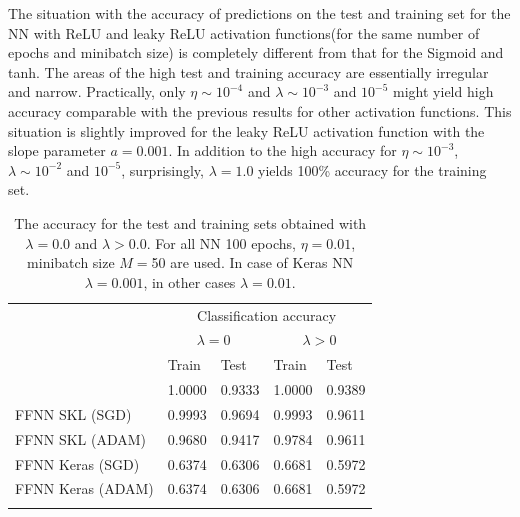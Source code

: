 \documentclass{emulateapj}
\begin{document}
The situation with the accuracy of predictions on the test and training set for the NN with ReLU and leaky ReLU activation functions(for the same number of epochs and minibatch size) is completely different from that for the Sigmoid and tanh. The areas of the high test and training accuracy are essentially irregular and narrow. Practically, only $\eta\sim10^{-4}$ and $\lambda\sim10^{-3}$ and $10^{-5}$ might yield high accuracy comparable with the previous results for other activation functions. This situation is slightly improved for the leaky ReLU activation function with the slope parameter $a=0.001$. In addition to the high accuracy for $\eta\sim10^{-3}$, $\lambda\sim10^{-2}$ and $10^{-5}$, surprisingly, $\lambda=1.0$ yields 100\% accuracy for the training set.


\begin{table}[!htb]
\begin{center}
\caption{\scriptsize The accuracy for the test and training sets obtained with $\lambda=0.0$ and $\lambda>0.0$. For all NN 100 epochs, $\eta=0.01$, minibatch size $M=$50 are used. In case of Keras NN $\lambda=0.001$, in other cases $\lambda=0.01$.}
\label{tab:Accuracy for FFNN with Keras}  
\begin{tabular}{lllll}
\cline{2-5}
\noalign{\smallskip}
& \multicolumn{4}{c}{Classification accuracy}\\
\cline{2-5}\noalign{\smallskip}
& \multicolumn{2}{c}{$\lambda = 0$} & \multicolumn{2}{c}{$\lambda > 0$}\\ \cline{2-5}\noalign{\smallskip} 
& Train & Test & Train & Test \\ \hline\noalign{\smallskip}
\multicolumn{1}{l|}{FFNN} & 1.0000 & 0.9333 & 1.0000 & 0.9389\\
\multicolumn{1}{l|}{FFNN SKL (SGD)} & 0.9993 & 0.9694 & 0.9993 & 0.9611\\
\multicolumn{1}{l|}{FFNN SKL (ADAM)} & 0.9680 & 0.9417 & 0.9784 & 0.9611\\
\multicolumn{1}{l|}{FFNN Keras (SGD)} & 0.6374 & 0.6306 & 0.6681 & 0.5972\\
\multicolumn{1}{l|}{FFNN Keras (ADAM)} & 0.6374 & 0.6306 & 0.6681 & 0.5972\\
 \noalign{\smallskip}\hline
\end{tabular}
\end{center}
\end{table}
\end{document}
